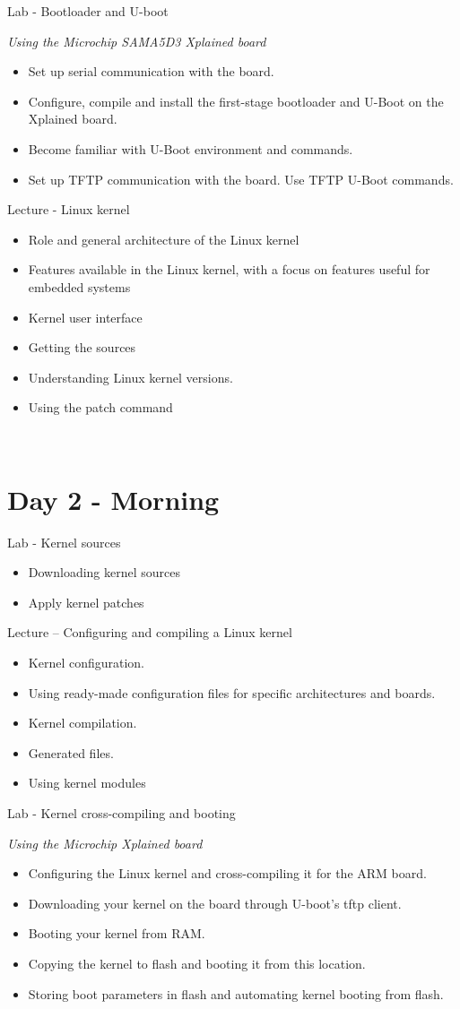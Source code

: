 \documentclass[a4paper,12pt,obeyspaces,spaces,hyphens]{article}
\begin{document}
\feagendatwocolumn
{Lab - Bootloader and U-boot}
{
  {\em Using the Microchip SAMA5D3 Xplained board}
  \begin{itemize}
  \item Set up serial communication with the board.
  \item Configure, compile and install the first-stage bootloader
        and U-Boot on the Xplained board.
  \item Become familiar with U-Boot environment and commands.
  \item Set up TFTP communication with the board. Use TFTP U-Boot commands.
  \end{itemize}
}
{Lecture - Linux kernel}
{
  \begin{itemize}
  \item Role and general architecture of the Linux kernel
  \item Features available in the Linux kernel,
        with a focus on features useful for embedded systems
  \item Kernel user interface
  \item Getting the sources
  \item Understanding Linux kernel versions.
  \item Using the patch command
  \end{itemize}
}
\\

\section{Day 2 - Morning}

\feagendatwocolumn
{Lab - Kernel sources}
{
  \begin{itemize}
  \item Downloading kernel sources
  \item Apply kernel patches
  \end{itemize}
}
{Lecture – Configuring and compiling a Linux kernel}
{
  \begin{itemize}
  \item Kernel configuration.
  \item Using ready-made configuration files for specific
    architectures and boards.
  \item Kernel compilation.
  \item Generated files.
  \item Using kernel modules
  \end{itemize}
}

\feagendaonecolumn
{Lab - Kernel cross-compiling and booting}
{
  {\em Using the Microchip Xplained board}
  \begin{itemize}
  \item Configuring the Linux kernel and cross-compiling it for the ARM board.
  \item Downloading your kernel on the board through U-boot's tftp client.
  \item Booting your kernel from RAM.
  \item Copying the kernel to flash and booting it from this location.
  \item Storing boot parameters in flash and automating kernel booting from flash.
  \end{itemize}
}
\end{document}
